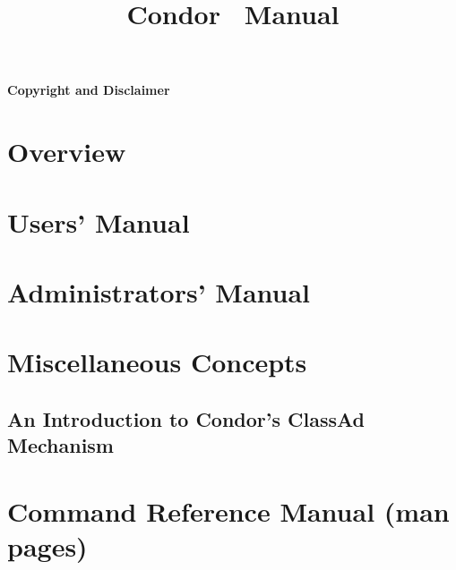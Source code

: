\documentclass[titlepage,oneside]{book}
\begin{document}
\title{Condor \VersionNotice\ Manual}
\author{\AuthorNotice}
\maketitle


\tableofcontents

\sloppy
\begin{small}
\subsubsection{Copyright and Disclaimer}
\label{sec:copyright-and-disclaimer}

\end{small}

\newpage
{}

\chapter{Overview}
\label{overview}


\chapter{Users' Manual}
\label{user-manual}


\chapter{Administrators' Manual}
\label{admin-manual}


%
%
\chapter{Miscellaneous Concepts}
\section{An Introduction to Condor's ClassAd Mechanism}
\label{classad-reference}


\chapter{Command Reference Manual (man pages)}
\label{command-reference}

\end{document}
